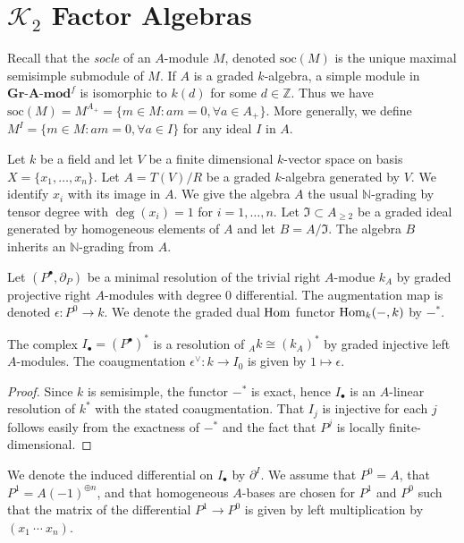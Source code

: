 \documentclass[11pt,righttag]{amsart}
\begin{document}
\section{${{\mathcal K}}_2$ Factor Algebras}
\label{factorK2}

Recall that the \emph{socle} of an $A$-module $M$, denoted ${\text{soc}}(M)$ is the unique maximal semisimple submodule of $M$. If $A$ is a graded $k$-algebra, a simple module in $\textbf{Gr-A-mod}^{f}$ is isomorphic to ${k}(d)$ for some $d\in{{\mathbb Z}}$. Thus  we have ${\text{soc}}(M)=M^{A_+}=\{m\in M: am=0, \forall a\in A_+\}$. More generally, we define $M^I=\{m\in M: am=0, \forall a\in I\}$ for any ideal $I$ in $A$.

Let $k$ be a field and let $V$ be a finite dimensional $k$-vector space on basis $X=\{x_1,\ldots,x_n\}$. Let $A=T(V)/R$ be a graded $k$-algebra generated by $V$. We identify $x_i$ with its image in $A$. We give the algebra $A$ the usual ${{\mathbb N}}$-grading by tensor degree with $\deg(x_i)=1$ for $i=1,\ldots,n$. Let ${\mathfrak{I}}\subset A_{\ge 2}$ be a graded ideal generated by homogeneous elements of $A$ and let $B=A/ {\mathfrak{I}}$. The algebra $B$ inherits an ${{\mathbb N}}$-grading from $A$. 

Let $(P^{\bullet},\partial_P)$ be a minimal resolution of the trivial right $A$-modue $k_A$ by 
graded projective right $A$-modules with degree 0 differential. The augmentation map is denoted $\epsilon:P^0\rightarrow k$. We denote the graded dual ${\hbox{Hom}}$ functor ${\hbox{Hom}}_k(-,k)$ by $-^*$.

\begin{lemma}
\label{injRes}
The complex $I_{\bullet}=(P^{\bullet})^*$ is a resolution of $_Ak{\cong} (k_A)^*$ by graded injective left $A$-modules. The coaugmentation $\epsilon^{\vee}:k\rightarrow I_0$ is given by $1\mapsto \epsilon$.
\end{lemma}

\begin{proof}
Since $k$ is semisimple, the functor $-^*$ is exact, hence $I_{\bullet}$ is an $A$-linear resolution of $k^*$ with the stated coaugmentation. 
That $I_j$ is injective for each $j$ follows easily from the exactness of $-^*$ and the fact that $P^j$ is locally finite-dimensional.

\end{proof}

We denote the induced differential on $I_{\bullet}$ by $\partial^I$. We assume that $P^0=A$, that $P^1=A(-1)^{\oplus n}$, and that homogeneous $A$-bases are chosen for $P^1$ and $P^0$ such that the matrix of the differential $P^1\rightarrow P^0$ is given by left multiplication by $(x_1\ \cdots\ x_n)$.  
\end{document}
